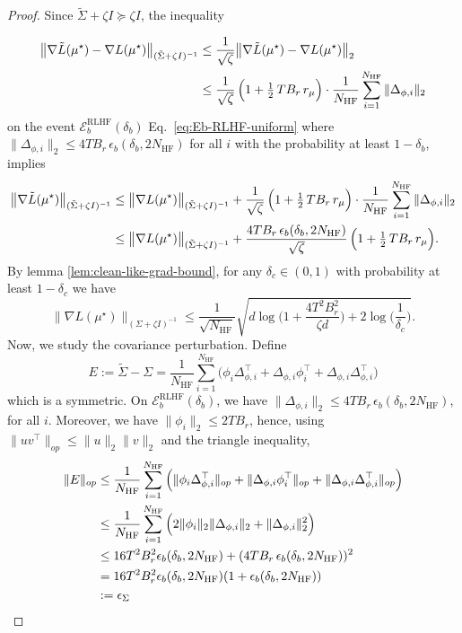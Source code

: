 \documentclass[10pt]{article} %
\theoremstyle{plain}
\theoremstyle{definition}
\theoremstyle{remark}
\begin{document}
\begin{proof}
Since \(\tilde\Sigma+\zeta I\succeq \zeta I\), the inequality

\begin{align}
\bigl\|\nabla\tilde L(\mu^\star)-\nabla L(\mu^\star)\bigr\|_{(\tilde\Sigma+\zeta I)^{-1}}
&\le \frac{1}{\sqrt{\zeta }}\bigl\|\nabla\tilde L(\mu^\star)-\nabla L(\mu^\star)\bigr\|_{2} \notag\\
&\le \frac{1}{\sqrt{\zeta }}\,
\Bigl(1+\tfrac12\,T B_r\,r_\mu\Bigr)\cdot
\frac{1}{N_{\mathrm{HF}}}\sum_{i=1}^{N_{\mathrm{HF}}}\|\Delta_{\phi,i}\|_2
\end{align}
on the event $\mathcal{E}_{b}^{\mathrm{RLHF}}(\delta_b)$ Eq.~\ref{eq:Eb-RLHF-uniform} where \(\|\Delta_{\phi,i}\|_2\le 4T B_r\,\epsilon_b(\delta_b, 2N_{\mathrm{HF}})\) for all \(i\) with the probability at least $1-\delta_b$, implies
\begin{align}\label{eq:grad-like-tilde-bound-half}
\bigl\|\nabla\tilde L(\mu^\star) \bigr\|_{(\tilde\Sigma+\zeta I)^{-1}}
&\le \bigl\|\nabla L(\mu^\star)\bigr\|_{(\tilde\Sigma+\zeta I)^{-1}}
+\frac{1}{\sqrt{\zeta }}\,
\Bigl(1+\tfrac12\,T B_r\,r_\mu\Bigr)\cdot
\frac{1}{N_{\mathrm{HF}}}\sum_{i=1}^{N_{\mathrm{HF}}}\|\Delta_{\phi,i}\|_2\notag\\
&\le \bigl\|\nabla L(\mu^\star)\bigr\|_{(\tilde\Sigma+\zeta I)^{-1}} + \frac{4T B_r\,\epsilon_b(\delta_b, 2N_{\mathrm{HF}})}{\sqrt{\zeta }}\,
\Bigl(1+\tfrac12\,T B_r\,r_\mu\Bigr).
\end{align}
By lemma \ref{lem:clean-like-grad-bound}, for any $\delta_c\in(0,1)$ with probability at least $1-\delta_c$ we have
 \begin{equation}\label{eq:grad-like-bound-half-way}
\bigl\|\nabla L(\mu^\star) \bigr\|_{(\Sigma+\zeta I)^{-1}}\le\frac{1}{\sqrt{N_{\mathrm{HF}}}}
\sqrt{d\log \Big(1+\frac{4T^2 B_r^2}{\zeta d}\Big)+2\log \Big(\frac{1}{\delta_c}\Big)}.
\end{equation}
Now, we study the covariance perturbation. Define
\[
E:= \tilde\Sigma-\Sigma=\frac{1}{N_{\mathrm{HF}}}\sum_{i=1}^{N_{\mathrm{HF}}}
\Big(\phi_i\Delta_{\phi,i}^\top+\Delta_{\phi,i}\phi_i^\top+\Delta_{\phi,i}\Delta_{\phi,i}^\top\Big)
\]
which is a symmetric. On $\mathcal{E}_{b}^{\mathrm{RLHF}}(\delta_b)$, we have $\|\Delta_{\phi,i}\|_2\le 4T B_r\,\epsilon_b(\delta_b, 2N_{\mathrm{HF}})$, for all $i$. 
Moreover, we have $\|\phi_i\|_2\le 2T B_r $,
hence, using $\|uv^\top\|_{op}\le \|u\|_2\|v\|_2$ and the triangle inequality,
\begin{align}
\|E\|_{op}
&\le \frac{1}{N_{\mathrm{HF}}}\sum_{i=1}^{N_{\mathrm{HF}}}
\Big(\|\phi_i\Delta_{\phi,i}^\top\|_{op}+\|\Delta_{\phi,i}\phi_i^\top\|_{op}
+\|\Delta_{\phi,i}\Delta_{\phi,i}^\top\|_{op}\Big)\notag\\
&\le \frac{1}{N_{\mathrm{HF}}}\sum_{i=1}^{N_{\mathrm{HF}}} \Big(2\|\phi_i\|_2\|\Delta_{\phi,i}\|_2+\|\Delta_{\phi,i}\|_2^2\Big)\notag\\
&\le 16T^2 B_r^2\epsilon_b(\delta_b, 2N_{\mathrm{HF}}) + (4T B_r\,\epsilon_b(\delta_b, 2N_{\mathrm{HF}}))^2\\
&=16T^2B_r^2\epsilon_b(\delta_b, 2N_{\mathrm{HF}})(1+\epsilon_b(\delta_b, 2N_{\mathrm{HF}}))\notag\\
&:=\epsilon_\Sigma
\label{eq:Eop_bd_remainder}
\end{align}


\end{proof}
\end{document}
